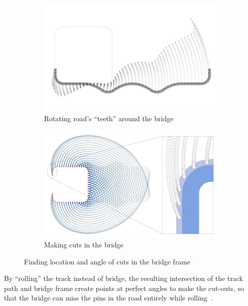 \documentclass[12pt]{article}
\begin{document}
        \begin{figure}[H]
            \centering
            \begin{subfigure}{0.49\textwidth}
            \centering
            \includegraphics[width = \textwidth]{images/bridge_teeth_1.jpg}
            \caption{Rotating road's ``teeth'' around the bridge}\label{fig:teeth1}
            \end{subfigure}
            \begin{subfigure}{0.49\textwidth}
            \centering
            \includegraphics[width = \textwidth]{images/bridge_teeth_2.jpg}
            \caption{Making cuts in the bridge}\label{fig:teeth2}
            \end{subfigure}

            \caption{Finding location and angle of cuts in the bridge frame~\cite{parker.2023}}
        \end{figure}
     
        By ``rolling'' the track instead of bridge, the resulting intersection of the track path and bridge frame create points at perfect angles to make the cut-outs, so that the bridge can miss the pins in the road entirely while rolling~\cite{parker.2023}.
        
\end{document}
